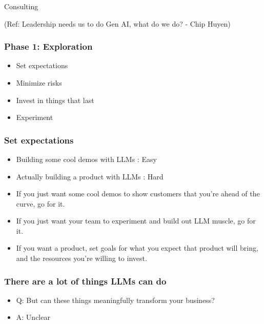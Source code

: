 \begin{frame}[fragile]\frametitle{}
\begin{center}
{\Large Consulting}

{\tiny (Ref: Leadership needs us to do Gen AI, what do we do? - Chip Huyen)}

\end{center}
\end{frame}


\begin{frame}[fragile]\frametitle{Phase 1: Exploration}

\begin{itemize}
\item Set expectations
\item Minimize risks
\item Invest in things that last
\item Experiment
\end{itemize}	

\end{frame}


\begin{frame}[fragile]\frametitle{Set expectations}

\begin{itemize}
\item Building some cool demos with LLMs : Easy
\item Actually building a product with LLMs : Hard
\item If you just want some cool demos to show customers that you’re ahead of the 
curve, go for it.
\item If you just want your team to experiment and build out LLM muscle, go for it.
\item If you want a product, set goals for what you expect that product will bring, and the 
resources you’re willing to invest.
\end{itemize}	

\end{frame}

\begin{frame}[fragile]\frametitle{There are a lot of things LLMs can do}

\begin{itemize}
\item Q: But can these things meaningfully transform your business?
\item A: Unclear
\end{itemize}	

\end{frame}


